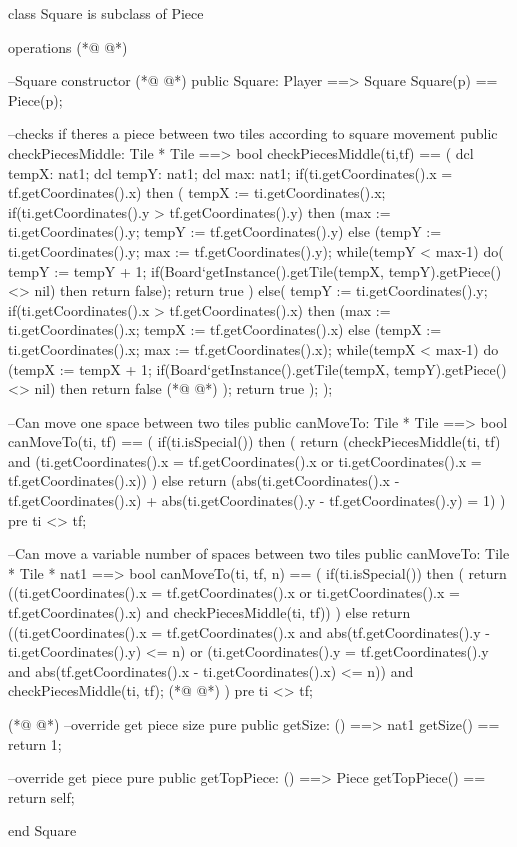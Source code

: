 \begin{vdmpp}[breaklines=true]
class Square is subclass of Piece

operations
(*@
\label{Square:4}
@*)


  --Square constructor
(*@
\label{checkPiecesMiddle:7}
@*)
  public Square: Player ==> Square
  Square(p) == Piece(p);
  
  
  --checks if theres a piece between two tiles according to square movement
  public checkPiecesMiddle: Tile * Tile ==> bool
  checkPiecesMiddle(ti,tf) == (
    dcl tempX: nat1;
    dcl tempY: nat1;
    dcl max: nat1;
    if(ti.getCoordinates().x = tf.getCoordinates().x)
     then (
        tempX := ti.getCoordinates().x;
        if(ti.getCoordinates().y > tf.getCoordinates().y)
         then (max := ti.getCoordinates().y; tempY := tf.getCoordinates().y)
         else (tempY := ti.getCoordinates().y; max := tf.getCoordinates().y);
        while(tempY < max-1)
         do(
           tempY := tempY + 1;
           if(Board`getInstance().getTile(tempX, tempY).getPiece() <> nil)
            then return false);
        return true
        )
     else(
         tempY := ti.getCoordinates().y;
         if(ti.getCoordinates().x > tf.getCoordinates().x)
         then (max := ti.getCoordinates().x; tempX := tf.getCoordinates().x)
         else (tempX := ti.getCoordinates().x; max := tf.getCoordinates().x);
        while(tempX < max-1)
         do (tempX := tempX + 1;
           if(Board`getInstance().getTile(tempX, tempY).getPiece() <> nil)
            then return false
(*@
\label{canMoveTo:39}
@*)
           );
        return true
    );
  );
  
  --Can move one space between two tiles
  public canMoveTo: Tile * Tile ==> bool
  canMoveTo(ti, tf) == (
   if(ti.isSpecial())
    then (
     return (checkPiecesMiddle(ti, tf) and
         (ti.getCoordinates().x = tf.getCoordinates().x or 
          ti.getCoordinates().x = tf.getCoordinates().x))
    )
   else
    return (abs(ti.getCoordinates().x - tf.getCoordinates().x) + abs(ti.getCoordinates().y - tf.getCoordinates().y) = 1)
  )
  pre ti <> tf;
  
  --Can move a variable number of spaces between two tiles
  public canMoveTo: Tile * Tile * nat1 ==> bool
  canMoveTo(ti, tf, n) == (
   if(ti.isSpecial())
    then (
     return ((ti.getCoordinates().x = tf.getCoordinates().x or 
          ti.getCoordinates().x = tf.getCoordinates().x) and checkPiecesMiddle(ti, tf))
    )
   else
    return ((ti.getCoordinates().x = tf.getCoordinates().x and
          abs(tf.getCoordinates().y - ti.getCoordinates().y) <= n) or
        (ti.getCoordinates().y = tf.getCoordinates().y and 
           abs(tf.getCoordinates().x - ti.getCoordinates().x) <= n)) and
        checkPiecesMiddle(ti, tf);
(*@
\label{getSize:72}
@*)
  )
  pre ti <> tf;

(*@
\label{getTopPiece:75}
@*)
  --override get piece size
  pure public getSize: () ==> nat1
  getSize() == return 1;
  
  --override get piece
  pure public getTopPiece: () ==> Piece
  getTopPiece() == return self;

end Square
\end{vdmpp}
